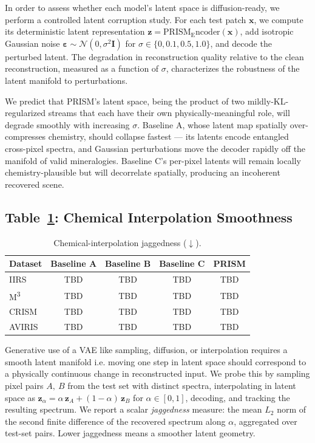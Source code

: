 \documentclass{article} %
\begin{document}
In order to assess whether each model's latent space is diffusion-ready, we perform a controlled latent corruption study. For each test patch $\mathbf{x}$, we compute its deterministic latent representation $\mathbf{z} = \mathrm{PRISM_Encoder}(\mathbf{x})$, add isotropic Gaussian noise $\boldsymbol{\varepsilon} \sim \mathcal{N}(0,\sigma^2\mathbf{I})$ for $\sigma \in \{0, 0.1, 0.5, 1.0\}$, and decode the perturbed latent. The degradation in reconstruction quality relative to the clean reconstruction, measured as a function of $\sigma$, characterizes the robustness of the latent manifold to perturbations.

We predict that PRISM's latent space, being the product of two mildly-KL-regularized streams that each have their own physically-meaningful role, will degrade smoothly with increasing $\sigma$. Baseline A, whose latent map spatially over-compresses chemistry, should collapse fastest --- its latents encode entangled cross-pixel spectra, and Gaussian perturbations move the decoder rapidly off the manifold of valid mineralogies. Baseline C's per-pixel latents will remain locally chemistry-plausible but will decorrelate spatially, producing an incoherent recovered scene.

\subsection{Table~\ref{tab:table4}: Chemical Interpolation Smoothness}

\begin{table}[t]
\centering
\small
\begin{tabular}{@{}lcccc@{}}
\toprule
Dataset & Baseline A & Baseline B & Baseline C & \textbf{PRISM} \\
\midrule
IIRS   & TBD & TBD & TBD & TBD \\
M\textsuperscript{3} & TBD & TBD & TBD & TBD \\
CRISM  & TBD & TBD & TBD & TBD \\
AVIRIS & TBD & TBD & TBD & TBD \\
\bottomrule
\end{tabular}
\caption{Chemical-interpolation jaggedness ($\downarrow$).}
\label{tab:table4}
\end{table}


Generative use of a VAE like sampling, diffusion, or interpolation requires a smooth latent manifold i.e. moving one step in latent space should correspond to a physically continuous change in reconstructed input. We probe this by sampling pixel pairs $A,\ B$ from the test set with distinct spectra, interpolating in latent space as $\mathbf{z}_{\alpha} = \alpha \, \mathbf{z}_A + (1 - \alpha) \, \mathbf{z}_B$ for $\alpha \in [0, 1]$, decoding, and tracking the resulting spectrum. We report a scalar \emph{jaggedness} measure: the mean $L_2$ norm of the second finite difference of the recovered spectrum along $\alpha$, aggregated over test-set pairs. Lower jaggedness means a smoother latent geometry.
\end{document}
